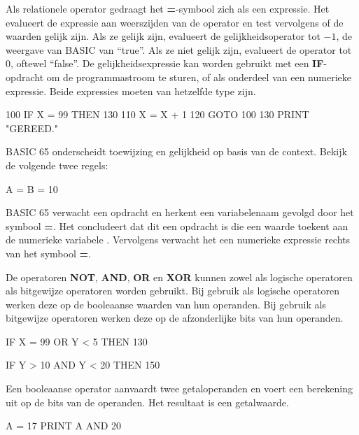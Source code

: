 
Als relationele operator gedraagt het {\bf =}-symbool zich als een expressie. Het evalueert de expressie aan weerszijden van de operator en test vervolgens of de waarden gelijk zijn. Als ze gelijk zijn, evalueert de gelijkheidsoperator tot $-1$, de weergave van BASIC van ``true''. Als ze niet gelijk zijn, evalueert de operator tot 0, oftewel ``false''. De gelijkheidsexpressie kan worden gebruikt met een {\bf IF}-opdracht om de programmastroom te sturen, of als onderdeel van een numerieke expressie. Beide expressies moeten van hetzelfde type zijn.

\begin{screencode}
100 IF X = 99 THEN 130
110 X = X + 1
120 GOTO 100
130 PRINT "GEREED."
\end{screencode}

BASIC 65 onderscheidt toewijzing en gelijkheid op basis van de context. Bekijk de volgende twee regels:

\begin{screencode}
A = B = 10
\end{screencode}

BASIC 65 verwacht een opdracht en herkent een variabelenaam gevolgd door het symbool {\bf =}. Het concludeert dat dit een opdracht is die een waarde toekent aan de numerieke variabele . Vervolgens verwacht het een numerieke expressie rechts van het symbool {\bf =}.

De operatoren {\bf NOT}, {\bf AND}, {\bf OR} en {\bf XOR} kunnen zowel als logische operatoren als bitgewijze operatoren worden gebruikt. Bij gebruik als logische operatoren werken deze op de booleaanse waarden van hun operanden. Bij gebruik als bitgewijze operatoren werken deze op de afzonderlijke bits van hun operanden.

\begin{screencode}
IF X = 99 OR Y < 5 THEN 130

IF Y > 10 AND Y < 20 THEN 150
\end{screencode}

Een booleaanse operator aanvaardt twee getaloperanden en voert een berekening uit op de bits van de operanden. Het resultaat is een getalwaarde.

\begin{screencode}
A = 17
PRINT A AND 20
\end{screencode}

